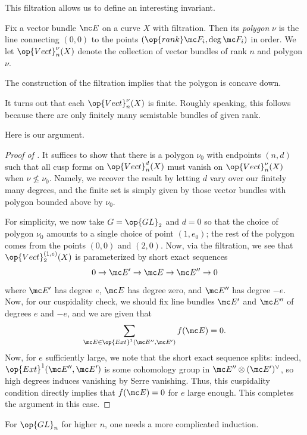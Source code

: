 \documentclass[../notes.tex]{subfiles}
\begin{document}
This filtration allows us to define an interesting invariant.
\begin{definition}[polygon]
	Fix a vector bundle $\mc E$ on a curve $X$ with filtration. Then its \textit{polygon} $\nu$ is the line connecting $(0,0)$ to the points $(\op{rank}\mc F_i,\deg\mc F_i)$ in order. We let $\op{Vect}_n^\nu(X)$ denote the collection of vector bundles of rank $n$ and polygon $\nu$.
\end{definition}
\begin{remark}
	The construction of the filtration implies that the polygon is concave down.
\end{remark}
\begin{remark}
	It turns out that each $\op{Vect}^\nu_n(X)$ is finite. Roughly speaking, this follows because there are only finitely many semistable bundles of given rank.
\end{remark}
Here is our argument.
\begin{proof}[Proof of ]
	It suffices to show that there is a polygon $\nu_0$ with endpoints $(n,d)$ such that all cusp forms on $\op{Vect}_n^d(X)$ must vanish on $\op{Vect}^\nu_n(X)$ when $\nu\not\le\nu_0$. Namely, we recover the result by letting $d$ vary over our finitely many degrees, and the finite set is simply given by those vector bundles with polygon bounded above by $\nu_0$.

	For simplicity, we now take $G=\op{GL}_2$ and $d=0$ so that the choice of polygon $\nu_0$ amounts to a single choice of point $(1,e_0)$; the rest of the polygon comes from the points $(0,0)$ and $(2,0)$. Now, via the filtration, we see that $\op{Vect}_2^{(1,e)}(X)$ is parameterized by short exact sequences
	\[0\to\mc E'\to\mc E\to\mc E''\to0\]
	where $\mc E'$ has degree $e$, $\mc E$ has degree zero, and $\mc E''$ has degree $-e$. Now, for our cuspidality check, we should fix line bundles $\mc E'$ and $\mc E''$ of degrees $e$ and $-e$, and we are given that
	\[\sum_{\mc E\in\op{Ext}^1(\mc E'',\mc E')}f(\mc E)=0.\]
	Now, for $e$ sufficiently large, we note that the short exact sequence splits: indeed, $\op{Ext}^1(\mc E'',\mc E')$ is some cohomology group in $\mc E''\otimes(\mc E')^\lor$, so high degrees induces vanishing by Serre vanishing. Thus, this cuspidality condition directly implies that $f(\mc E)=0$ for $e$ large enough. This completes the argument in this case.
\end{proof}
\begin{remark}
	For $\op{GL}_n$ for higher $n$, one needs a more complicated induction.
\end{remark}
\end{document}
